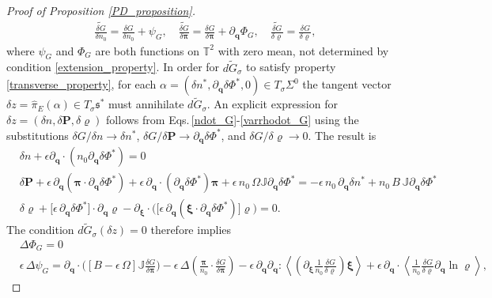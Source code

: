 \documentclass[%
 aip,
 amsmath,amssymb,
reprint, onecolumn %
]{revtex4-1}
\begin{document}
\begin{proof}[Proof of Proposition \ref{PD_proposition}]
\begin{align*}
\widetilde{\frac{\delta G}{\delta n_0}}  = \frac{\delta G}{\delta n_0} + \psi_G,\quad \widetilde{\frac{\delta G}{\delta\bm{\pi}}}  = \frac{\delta G}{\delta\bm{\pi}} + \partial_{\bm{q}}\Phi_G,\quad \widetilde{\frac{\delta G}{\delta\varrho}}  = \frac{\delta G}{\delta \varrho},
\end{align*}
where $\psi_G$ and $\Phi_G$ are both functions on $\mathbb{T}^2$ with zero mean, not determined by condition \eqref{extension_property}. In order for $\widetilde{dG_\sigma}$ to satisfy property \eqref{transverse_property}, for each $\alpha = (\delta n^*,\partial_{\bm{q}}\delta\Phi^*,0)\in T_\sigma\Sigma^0$ the tangent vector $\delta z = \widehat{\pi}_E(\alpha)\in T_\sigma\mathfrak{s}^*$ must annihilate $\widetilde{dG_\sigma}$. An explicit expression for $\delta z = (\delta n,\delta\bm{P},\delta\varrho)$ follows from Eqs.\,\eqref{ndot_G}-\eqref{varrhodot_G} using the substitutions $\delta G/\delta n\rightarrow \delta n^*$, $\delta G/\delta \bm{P}\rightarrow \partial_{\bm{q}}\delta \Phi^*$, and $\delta G/\delta\varrho\rightarrow 0$. The result is
\begin{align}
&\delta n +\epsilon\partial_{\bm{q}}\cdot\left(n_0\partial_{\bm{q}}\delta\Phi^*\right) = 0 \label{delta_n_biv}\\
&\delta\bm{P} + \epsilon\,\partial_{\bm{q}}\left( {\bm{\pi}}\cdot \partial_{\bm{q}}\delta\Phi^*\right) + \epsilon\,\partial_{\bm{q}}\cdot\left(\partial_{\bm{q}}\delta\Phi^*\right){\bm{\pi}} + \epsilon\,n_0\,\Omega\mathbb{J}\partial_{\bm{q}}\delta\Phi^* = - \epsilon\,n_0\,\partial_{\bm{q}}\delta n^* + n_0\,B\,\mathbb{J}\partial_{\bm{q}}\delta\Phi^* \label{delta_P_biv}\\
&\delta\varrho + \bigg[\epsilon\,\partial_{\bm{q}}\delta\Phi^* \bigg]\cdot\partial_{\bm{q}}\varrho- \partial_{\bm{\xi}}\cdot\bigg(\bigg[\epsilon\,\partial_{\bm{q}}\left(\bm{\xi}\cdot\partial_{\bm{q}}\delta\Phi^*\right)\bigg]\varrho\bigg) = 0.\label{delta_varrho_biv}
\end{align}
The condition $\widetilde{dG_\sigma}(\delta z) = 0$ therefore implies
\begin{align*}
&\Delta \Phi_G = 0\\
&\epsilon\,\Delta \psi_G = \partial_{\bm{q}}\cdot\bigg([B -\epsilon\,\Omega]\mathbb{J}\frac{\delta G}{\delta\bm{\pi}}\bigg) - \epsilon\,\Delta\left(\frac{\bm{\pi}}{n_0}\cdot \frac{\delta G}{\delta\bm{\pi}}\right) - \epsilon\,\partial_{\bm{q}}\partial_{\bm{q}}:\left\langle\left(\partial_{\bm{\xi}}\frac{1}{n_0}\frac{\delta G}{\delta \varrho}\right)\bm{\xi}\right\rangle + \epsilon\,\partial_{\bm{q}}\cdot\left\langle \frac{1}{n_0}\frac{\delta G}{\delta \varrho}\partial_{\bm{q}}\ln\varrho\right\rangle,

\end{align*}
\end{proof}
\end{document}
